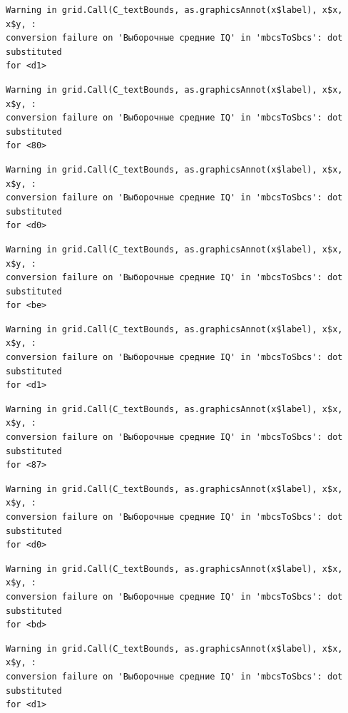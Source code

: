 \documentclass[
  letterpaper,
  DIV=11,
  numbers=noendperiod]{scrreprt}
\theoremstyle{definition}
\theoremstyle{remark}
\begin{document}
\begin{verbatim}
Warning in grid.Call(C_textBounds, as.graphicsAnnot(x$label), x$x, x$y, :
conversion failure on 'Выборочные средние IQ' in 'mbcsToSbcs': dot substituted
for <d1>
\end{verbatim}

\begin{verbatim}
Warning in grid.Call(C_textBounds, as.graphicsAnnot(x$label), x$x, x$y, :
conversion failure on 'Выборочные средние IQ' in 'mbcsToSbcs': dot substituted
for <80>
\end{verbatim}

\begin{verbatim}
Warning in grid.Call(C_textBounds, as.graphicsAnnot(x$label), x$x, x$y, :
conversion failure on 'Выборочные средние IQ' in 'mbcsToSbcs': dot substituted
for <d0>
\end{verbatim}

\begin{verbatim}
Warning in grid.Call(C_textBounds, as.graphicsAnnot(x$label), x$x, x$y, :
conversion failure on 'Выборочные средние IQ' in 'mbcsToSbcs': dot substituted
for <be>
\end{verbatim}

\begin{verbatim}
Warning in grid.Call(C_textBounds, as.graphicsAnnot(x$label), x$x, x$y, :
conversion failure on 'Выборочные средние IQ' in 'mbcsToSbcs': dot substituted
for <d1>
\end{verbatim}

\begin{verbatim}
Warning in grid.Call(C_textBounds, as.graphicsAnnot(x$label), x$x, x$y, :
conversion failure on 'Выборочные средние IQ' in 'mbcsToSbcs': dot substituted
for <87>
\end{verbatim}

\begin{verbatim}
Warning in grid.Call(C_textBounds, as.graphicsAnnot(x$label), x$x, x$y, :
conversion failure on 'Выборочные средние IQ' in 'mbcsToSbcs': dot substituted
for <d0>
\end{verbatim}

\begin{verbatim}
Warning in grid.Call(C_textBounds, as.graphicsAnnot(x$label), x$x, x$y, :
conversion failure on 'Выборочные средние IQ' in 'mbcsToSbcs': dot substituted
for <bd>
\end{verbatim}

\begin{verbatim}
Warning in grid.Call(C_textBounds, as.graphicsAnnot(x$label), x$x, x$y, :
conversion failure on 'Выборочные средние IQ' in 'mbcsToSbcs': dot substituted
for <d1>
\end{verbatim}
\end{document}
